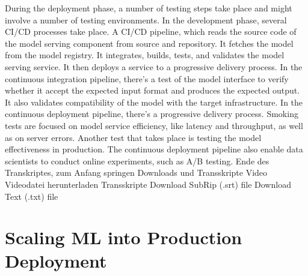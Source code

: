 {{{{{     During the deployment phase, a number of testing steps
     take place and might involve a number of testing environments.
     In the development phase, several CI/CD processes take place.
     A CI/CD pipeline, which reads the source code of the model serving component
     from source and repository.
     It fetches the model from the model registry.
     It integrates, builds, tests, and validates the model serving service.
     It then deploys a service to a progressive delivery process.
     In the continuous integration pipeline, there's a test of the model interface
     to verify whether it accept the expected input format
     and produces the expected output.
     It also validates compatibility of the model with the target infrastructure.
     In the continuous deployment pipeline, there's a progressive delivery process.
     Smoking tests are focused on model service efficiency,
     like latency and throughput, as well as on server errors.
     Another test that takes place is testing the model effectiveness in production.
     The continuous deployment pipeline also enable
     data scientists to conduct online experiments, such as A/B testing.
     Ende des Transkriptes, zum Anfang springen
     Downloads und Transskripte
     Video
     Videodatei herunterladen
     Transskripte
     Download SubRip (.srt) file
     Download Text (.txt) file
 
 \section{Scaling ML into Production Deployment}
 
}}}}}
